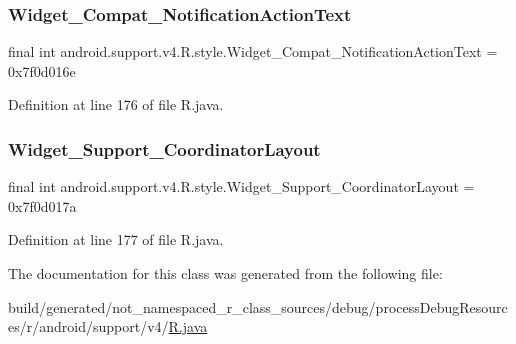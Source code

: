 \subsubsection{\texorpdfstring{Widget\_Compat\_NotificationActionText}{Widget\_Compat\_NotificationActionText}}
{\footnotesize\ttfamily final int android.\+support.\+v4.\+R.\+style.\+Widget\+\_\+\+Compat\+\_\+\+Notification\+Action\+Text = 0x7f0d016e\hspace{0.3cm}{\ttfamily [static]}}



Definition at line 176 of file R.\+java.

\mbox{\label{classandroid_1_1support_1_1v4_1_1_r_1_1style_abc274aabfe5c00cd05caa1f05494654b}} 
\subsubsection{\texorpdfstring{Widget\_Support\_CoordinatorLayout}{Widget\_Support\_CoordinatorLayout}}
{\footnotesize\ttfamily final int android.\+support.\+v4.\+R.\+style.\+Widget\+\_\+\+Support\+\_\+\+Coordinator\+Layout = 0x7f0d017a\hspace{0.3cm}{\ttfamily [static]}}



Definition at line 177 of file R.\+java.



The documentation for this class was generated from the following file\+:\begin{DoxyCompactItemize}
\item 
build/generated/not\+\_\+namespaced\+\_\+r\+\_\+class\+\_\+sources/debug/process\+Debug\+Resources/r/android/support/v4/\mbox{\hyperlink{android_2support_2v4_2_r_8java}{R.\+java}}\end{DoxyCompactItemize}
